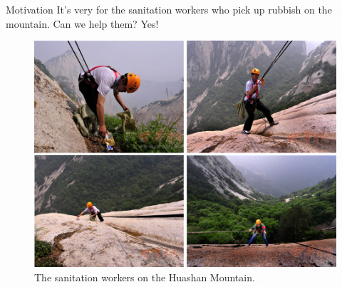 \documentclass[newPxFont, fullfooter, sectionpages, progressbar, displaynote]{beamer}
\begin{document}
\begin{frame}[c]{Motivation}
	It's very  for the sanitation workers who pick up rubbish on the mountain. Can we help them? Yes!
	\begin{figure}
		\centering
		{
			\includegraphics[height=0.5\textheight]{images/sanitation_worker.png}
			\caption*{The sanitation workers on the Huashan Mountain.}
		}
	\end{figure}
	\begin{center}
	\end{center}

\end{frame}
\end{document}
